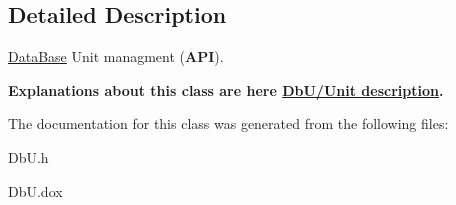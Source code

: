 \subsection{Detailed Description}
\hyperlink{classHurricane_1_1DataBase}{Data\+Base} Unit managment ({\bfseries A\+PI}). 

{\bfseries Explanations about this class are here \hyperlink{group__DbUGroup}{Db\+U/\+Unit description}.} 

The documentation for this class was generated from the following files\+:\begin{DoxyCompactItemize}
\item 
Db\+U.\+h\item 
Db\+U.\+dox\end{DoxyCompactItemize}
